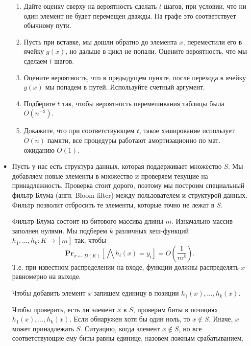 \begin{itemize}
\begin{enumerate}
      \item Дайте оценку сверху на вероятность сделать $t$ шагов, при условии, что ни 
        один элемент не будет перемещен дважды. На графе это соответствует обычному пути.

      \item Пусть при вставке, мы дошли обратно до элемента $x$, переместили его в ячейку
        $g(x)$, но дальше в цикл не попали. Оцените вероятность, что мы сделаем $t$ шагов.
  
      \item Оцените вероятность, что в предыдущем пункте, после перехода в ячейку $g(x)$
        мы попадем в путей. Используйте счетный аргумент.

      \item Подберите $t$ так, чтобы вероятность перемешивания таблицы была $O(n^{-2})$.
      
      \item Докажите, что при соответствующем $t$, такое хэширование использует $O(n)$ памяти,
        все процедуры работают амортизационно по мат. ожиданию $O(1)$.
        
    \end{enumerate}
  \item Пусть у нас есть структура данных, которая поддерживает множество $S$.
    Мы добавляем новые элементы в множество и проверяем текущие на 
    принадлежность. Проверка стоит дорого, поэтому мы построим специальный 
    фильтр Блума (англ. Bloom filter) между пользователем и структурой данных. 
    Фильтр позволит отбросить те элементы, которые точно не лежат в $S$. 

    Фильтр Блума состоит из битового массива длины $m$. Изначально массив 
    заполнен нулями. Мы подберем $k$ различных хеш-функций 
    $h_1, …, h_k : K \rightarrow [m]$
    так, чтобы 
    $$\textbf{Pr}_{x \leftarrow D(K)}\left[\bigwedge h_i(x) = y_i\right] 
      = O\left(\frac{1}{m^k}\right).$$
    Т.е. при известном распределении на входе, функции должны распределять $x$
    равномерно на выходе.

    Чтобы добавить элемент $x$ запишем единицу в позиции $h_1(x), …, h_k(x)$.

    Чтобы проверить, есть ли элемент $x$ в $S$, проверим биты в позициях
    $h_1(x), …, h_k(x)$. Если обнаружен хотя бы один ноль, то $x \not\in S$.
    Иначе, $x$ может принадлежать $S$. Ситуацию, когда элемент $x \not\in S$, но 
    все соответствующие ему биты равны единице, назовем ложным срабатыванием.


\end{itemize}

